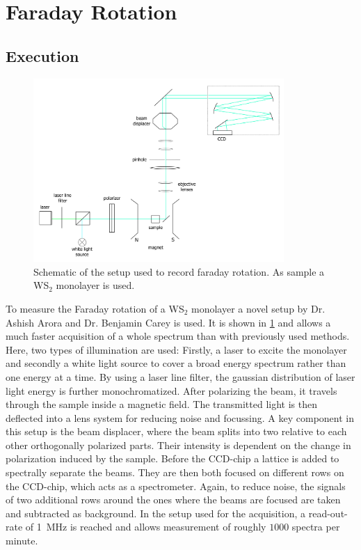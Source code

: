 \newpage
\section{Faraday Rotation}

\subsection{Execution}

\begin{figure}[!ht]
    \centering
    \includegraphics[width=0.85\textwidth]{img/setup3.png}
    \caption{Schematic of the setup used to record faraday rotation. As sample a WS$_2$ monolayer is used.}
    \label{fig_setup3}
\end{figure}
To measure the Faraday rotation of a WS$_2$ monolayer a novel setup by Dr. Ashish Arora and Dr. Benjamin Carey is used.
It is shown in \cref{fig_setup3} and allows a much faster acquisition of a whole spectrum than with previously used methods.
Here, two types of illumination are used:
Firstly, a laser to excite the monolayer and secondly a white light source to cover a broad energy spectrum rather than one energy at a time.
By using a laser line filter, the gaussian distribution of laser light energy is further monochromatized.
After polarizing the beam, it travels through the sample inside a magnetic field.
The transmitted light is then deflected into a lens system for reducing noise and focussing.
A key component in this setup is the beam displacer, where the beam splits into two relative to each other orthogonally polarized parts.
Their intensity is dependent on the change in polarization induced by the sample.
Before the CCD-chip a lattice is added to spectrally separate the beams.
They are then both focused on different rows on the CCD-chip, which acts as a spectrometer.
Again, to reduce noise, the signals of two additional rows around the ones where the beams are focused are taken and subtracted as background.
In the setup used for the acquisition, a read-out-rate of \SI{1}{\mega\hertz} is reached and allows measurement of roughly $1000$ spectra per minute.

